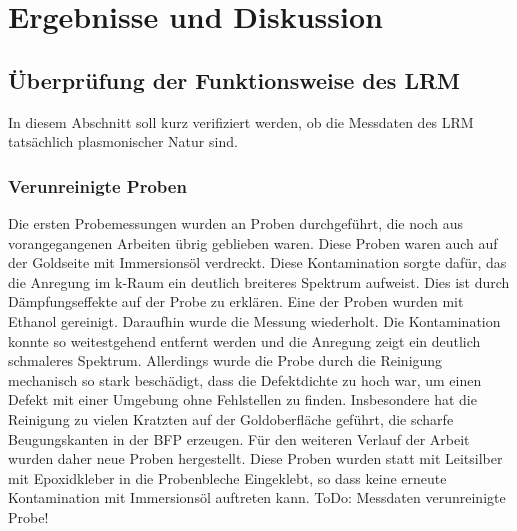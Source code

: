 \documentclass[titlepage]{article}
\begin{document}
\section{Ergebnisse und Diskussion}
	\subsection{Überprüfung der Funktionsweise des LRM}
		In diesem Abschnitt soll kurz verifiziert werden, ob die Messdaten des LRM tatsächlich plasmonischer Natur sind.
		\subsubsection{Verunreinigte Proben}
			Die ersten Probemessungen wurden an Proben durchgeführt, die noch aus vorangegangenen Arbeiten übrig geblieben waren. Diese Proben waren auch auf der Goldseite mit Immersionsöl verdreckt. Diese Kontamination sorgte dafür, das die Anregung im k-Raum ein deutlich breiteres Spektrum aufweist. Dies ist durch Dämpfungseffekte auf der Probe zu erklären. Eine der Proben wurden mit Ethanol gereinigt. Daraufhin wurde die Messung wiederholt. Die Kontamination konnte so weitestgehend entfernt werden und die Anregung zeigt ein deutlich schmaleres Spektrum. Allerdings wurde die Probe durch die Reinigung mechanisch so stark beschädigt, dass die Defektdichte zu hoch war, um einen Defekt mit einer Umgebung ohne Fehlstellen zu finden. Insbesondere hat die Reinigung zu vielen Kratzten auf der Goldoberfläche geführt, die scharfe Beugungskanten in der BFP  erzeugen. Für den weiteren Verlauf der Arbeit wurden daher neue Proben hergestellt. Diese Proben wurden statt mit Leitsilber mit Epoxidkleber in die Probenbleche Eingeklebt, so dass keine erneute Kontamination mit Immersionsöl auftreten kann. ToDo: Messdaten verunreinigte Probe!
\end{document}
